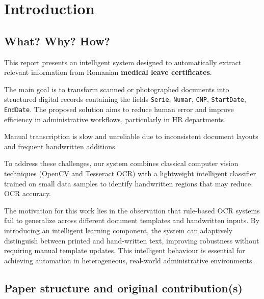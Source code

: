 \documentclass[runningheads,a4paper,11pt]{report}
\begin{document}
\tableofcontents

\newpage

\listoftables
\listoffigures
\listofalgorithms

\newpage




\newpage






\chapter{Introduction}
\label{chapter:introduction}

\section{What? Why? How?}
\label{section:what}

This report presents an intelligent system designed to automatically extract relevant information from Romanian \textbf{medical leave certificates}.

The main goal is to transform scanned or photographed documents into structured digital records containing the fields \texttt{Serie}, \texttt{Numar}, \texttt{CNP}, \texttt{StartDate}, \texttt{EndDate}.
The proposed solution aims to reduce human error and improve efficiency in administrative workflows, particularly in HR departments.

Manual transcription is slow and unreliable due to inconsistent document layouts and frequent handwritten additions.

To address these challenges, our system combines classical computer vision techniques (OpenCV and Tesseract OCR) with a lightweight intelligent classifier trained on small data samples to identify handwritten regions that may reduce OCR accuracy.

The motivation for this work lies in the observation that rule-based OCR systems fail to generalize across different document templates and handwritten inputs.
By introducing an intelligent learning component, the system can adaptively distinguish between printed and hand-written text, improving robustness without requiring manual template updates.
This intelligent behaviour is essential for achieving automation in heterogeneous, real-world administrative environments.


\section{Paper structure and original contribution(s)}
\label{section:structure}
\end{document}
